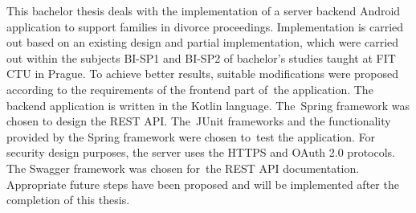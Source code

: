 This bachelor thesis deals with the implementation of a server backend Android application to support families in divorce proceedings. Implementation is carried out based on an existing design and partial implementation, which were carried out within the subjects BI-SP1 and BI-SP2 of bachelor's studies taught at FIT CTU in Prague. To achieve better results, suitable modifications were proposed according to the requirements of the frontend part of~the application. The backend application is written in the Kotlin language. The~Spring framework was chosen to design the REST API. The~JUnit frameworks and the functionality provided by the Spring framework were chosen to~test the application. For security design purposes, the server uses the HTTPS and OAuth 2.0 protocols. The Swagger framework was chosen for~the REST API documentation. Appropriate future steps have been proposed and will be implemented after the completion of this thesis.